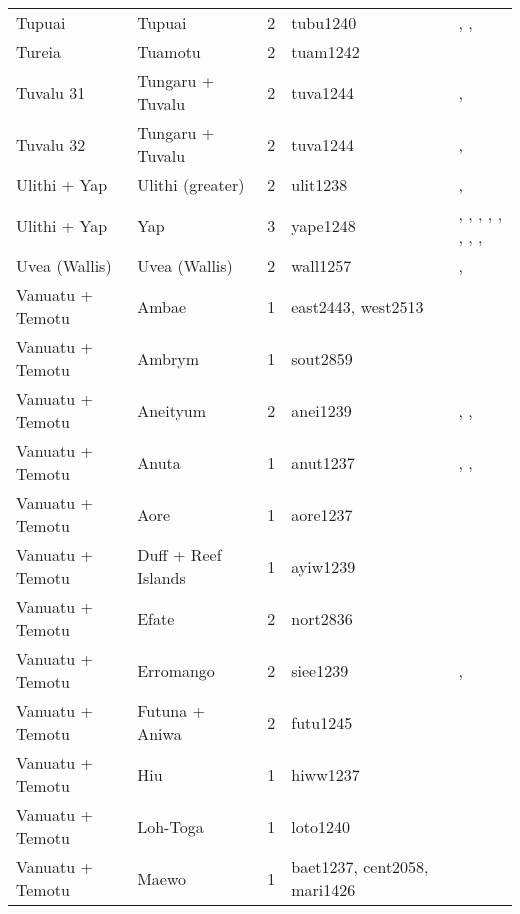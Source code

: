 \begin{longtable}{p{4.5cm}p{2cm}p{2cm}p{4cm}p{4cm}}
  Tupuai & Tupuai & 2 & tubu1240 & \citet{aitken1930ethnology}, \citet{bollt2008excavations}, \citet{edwards2003archaeological} \\ 
  Tureia & Tuamotu & 2 & tuam1242 & \citet{emory1975material} \\ 
  Tuvalu 31 & Tungaru + Tuvalu & 2 & tuva1244 & \citet{macdonald1982cinderellas}, \citet{goldsmith1991} \\ 
  Tuvalu 32 & Tungaru + Tuvalu & 2 & tuva1244 & \citet{macdonald1982cinderellas}, \citet{goldsmith1991} \\ 
  Ulithi + Yap & Ulithi (greater) & 2 & ulit1238 & \citet{lessa1950}, \citet{lessa1966} \\ 
  Ulithi + Yap & Yap & 3 & yape1248 & \citet{huntetal1949}, \citet{muller1917}, \citet{murdocketal1944b}, \citet{salesius1906}, \citet{schneider1953}, \citet{schneider1957_yap}, \citet{schneider1962}, \citet{tetens_savages}, \citet{tetensandkubary1873} \\ 
  Uvea (Wallis) & Uvea (Wallis) & 2 & wall1257 & \citet{burrows1937}, \citet{pollock1995power} \\ 
  Vanuatu + Temotu & Ambae & 1 & east2443, west2513 & \citet{bonnemaison1972systeme} \\ 
  Vanuatu + Temotu & Ambrym & 1 & sout2859 & \citet{tonkinson1981church} \\ 
  Vanuatu + Temotu & Aneityum & 2 & anei1239 & \citet{humphreys1926}, \citet{spriggs1982taro}, \citet{spriggs1986landscape} \\ 
  Vanuatu + Temotu & Anuta & 1 & anut1237 & \citet{feinberg1988socio}, \citet{feinberg1991}, \citet{kirch2002te} \\ 
  Vanuatu + Temotu & Aore & 1 & aore1237 & \citet{bonnemaison1996power} \\ 
  Vanuatu + Temotu & Duff + Reef Islands & 1 & ayiw1239 & \citet{davenport1969} \\ 
  Vanuatu + Temotu & Efate & 2 & nort2836 & \citet{facey1981hereditary} \\ 
  Vanuatu + Temotu & Erromango & 2 & siee1239 & \citet{humphreys1926}, \citet{spriggs1989archaeological} \\ 
  Vanuatu + Temotu & Futuna + Aniwa & 2 & futu1245 & \citet{capell1958culture} \\ 
  Vanuatu + Temotu & Hiu & 1 & hiww1237 & \citet{bonnemaison1996power} \\ 
  Vanuatu + Temotu & Loh-Toga & 1 & loto1240 & \citet{bonnemaison1996power} \\ 
  Vanuatu + Temotu & Maewo & 1 & baet1237, cent2058, mari1426 & \citet{bonnemaison1996power} \\ 

\end{longtable}
